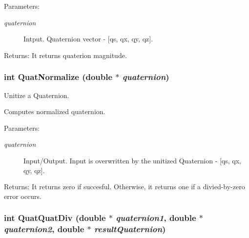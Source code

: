 \begin{Desc}
\item[Parameters:]
\begin{description}
\item[{\em quaternion}]Intput. Quaternion vector - \mbox{[}qs, qx, qy, qz\mbox{]}.\end{description}
\end{Desc}
\begin{Desc}
\item[Returns:]It returns quaterion magnitude. \end{Desc}
\hypertarget{group__quaternion_g2202f5791224a99890e77027cbfdc9a8}{
\subsubsection[QuatNormalize]{\setlength{\rightskip}{0pt plus 5cm}int QuatNormalize (double $\ast$ {\em quaternion})}}
\label{group__quaternion_g2202f5791224a99890e77027cbfdc9a8}


Unitize a Quaternion. 

Computes normalized quaternion.

\begin{Desc}
\item[Parameters:]
\begin{description}
\item[{\em quaternion}]Input/Output. Input is overwritten by the unitized Quaternion - \mbox{[}qs, qx, qy, qz\mbox{]}.\end{description}
\end{Desc}
\begin{Desc}
\item[Returns:]It returns zero if succesful. Otherwise, it returns one if a divied-by-zero error occurs. \end{Desc}
\hypertarget{group__quaternion_g46246ce9c280deac81df5a5c1726e0d3}{
\subsubsection[QuatQuatDiv]{\setlength{\rightskip}{0pt plus 5cm}int QuatQuatDiv (double $\ast$ {\em quaternion1}, \/  double $\ast$ {\em quaternion2}, \/  double $\ast$ {\em resultQuaternion})}}
\label{group__quaternion_g46246ce9c280deac81df5a5c1726e0d3}


